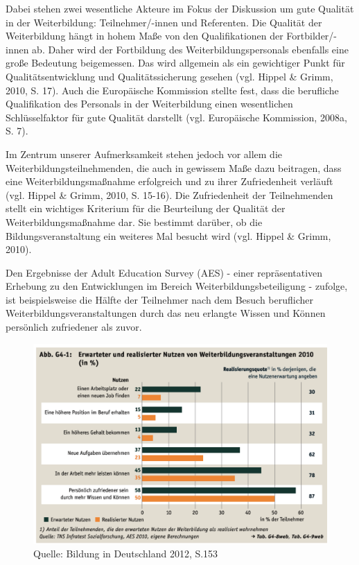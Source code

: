 \documentclass[12pt,a4paper]{article}
\begin{document}
Dabei stehen zwei wesentliche Akteure im Fokus der Diskussion um gute Qualität in der Weiterbildung: Teilnehmer/-innen und Referenten. Die Qualität der Weiterbildung hängt in hohem Maße von den Qualifikationen der Fortbilder/-innen ab. Daher wird der Fortbildung des Weiterbildungspersonals ebenfalls eine große Bedeutung beigemessen. Das wird allgemein als ein gewichtiger Punkt für Qualitätsentwicklung und Qualitätssicherung gesehen (vgl. Hippel \& Grimm, 2010, S. 17). Auch die Europäische Kommission stellte fest, dass die berufliche Qualifikation des Personals in der Weiterbildung einen wesentlichen Schlüsselfaktor für gute Qualität darstellt (vgl. Europäische Kommission, 2008a, S. 7). 

Im Zentrum unserer Aufmerksamkeit stehen jedoch vor allem die Weiterbildungsteilnehmenden, die auch in gewissem Maße dazu beitragen, dass eine Weiterbildungsmaßnahme erfolgreich und zu ihrer Zufriedenheit verläuft (vgl. Hippel \& Grimm, 2010, S. 15-16). Die Zufriedenheit der Teilnehmenden stellt ein wichtiges Kriterium für die Beurteilung der Qualität der Weiterbildungsmaßnahme dar. Sie bestimmt darüber, ob die Bildungsveranstaltung ein weiteres Mal besucht wird (vgl. Hippel \& Grimm, 2010). 

Den Ergebnisse der Adult Education Survey (AES) - einer repräsentativen Erhebung zu den Entwicklungen im Bereich Weiterbildungsbeteiligung -  zufolge, ist beispielsweise die Hälfte der Teilnehmer nach dem Besuch beruflicher Weiterbildungsveranstaltungen durch das neu erlangte Wissen und Können persönlich zufriedener als zuvor. 

\begin{figure}[!ht]
\includegraphics[scale=0.48]{abbg41.pdf}
\caption{Quelle: Bildung in Deutschland 2012, S.153}
\label{}
\end{figure}
\end{document}
